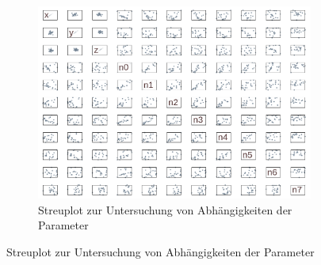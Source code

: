 \begin{landscape}
\begin{figure}[!ht]
	\qquad
	\begin{subfigure}[t]{0.45\textheight}
			\centering
	   \includegraphics[width=\textwidth]{img/evo/Scatter4089.png}
	   	       \caption{Streuplot zur Untersuchung von Abhängigkeiten der Parameter}
	\end{subfigure}

\end{figure}
\newpage
\end{landscape}

%
